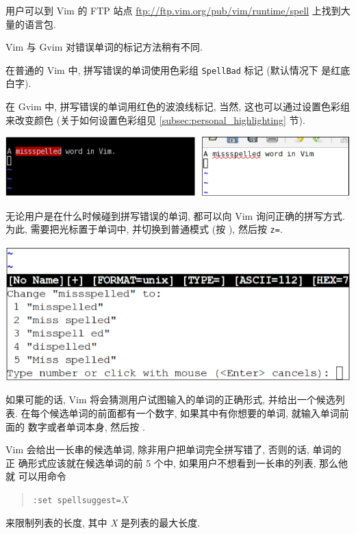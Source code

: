 \begin{warning}
    用户可以到 Vim 的 FTP 站点 \url{ftp://ftp.vim.org/pub/vim/runtime/spell}
    上找到大量的语言包.
\end{warning}

Vim 与 Gvim 对错误单词的标记方法稍有不同.

在普通的 Vim 中, 拼写错误的单词使用色彩组 \texttt{SpellBad} 标记 (默认情况下 
是红底白字).

在 Gvim 中, 拼写错误的单词用红色的波浪线标记, 当然, 这也可以通过设置色彩组
来改变颜色 (关于如何设置色彩组见 \ref{subsec:personal_highlighting} 节).

\begin{center}
    \includegraphics[scale=0.5]{./images/page42-1.png}
\end{center}

无论用户是在什么时候碰到拼写错误的单词, 都可以向 Vim 询问正确的拼写方式.
为此, 需要把光标置于单词中, 并切换到普通模式 (按 ), 然后按
\texttt{z=}.

\begin{center}
    \includegraphics[scale=0.5]{./images/page42-2.png}
\end{center}

如果可能的话, Vim 将会猜测用户试图输入的单词的正确形式, 并给出一个候选列表.
在每个候选单词的前面都有一个数字, 如果其中有你想要的单词, 就输入单词前面的
数字或者单词本身, 然后按 .

Vim 会给出一长串的候选单词, 除非用户把单词完全拼写错了, 否则的话, 单词的正
确形式应该就在候选单词的前 5 个中, 如果用户不想看到一长串的列表, 那么他就
可以用命令
\begin{quotation}
    \texttt{:set spellsuggest=}\textit{X}
\end{quotation}
来限制列表的长度, 其中 \textit{X} 是列表的最大长度.

